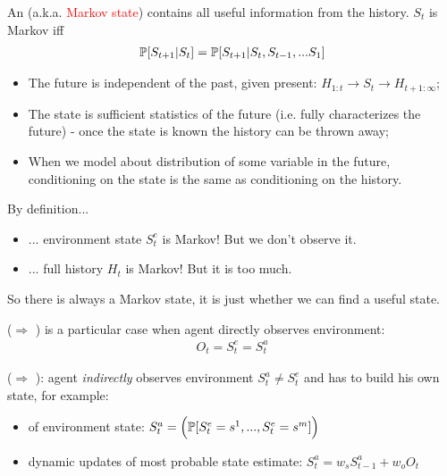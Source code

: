 An  (a.k.a. \textcolor{red}{Markov state}) contains all useful information from the history. $S_t$ is Markov iff
\begin{align*}
\mathbb{P} [S_{t+1}|S_t]	= \mathbb{P}[S_{t+1}| S_t, S_{t-1}, ... S_1]
\end{align*}
\begin{itemize}
	\item The future is independent of the past, given present: $H_{1:t} \to S_t \to H_{t+1:\infty}$;
	\item The state is sufficient statistics of the future (i.e. fully characterizes the future) - once the state is known the history can be thrown away;
	\item When we model about distribution of some variable in the future, conditioning on the state is the same as conditioning on the history.
\end{itemize}

\begin{notebox}
By definition...
	\begin{itemize}
		\item 	... environment state $S_t^e$ is Markov! But we don't observe it.
		\item   ... full history $H_t$ is Markov! But it is too much.
	\end{itemize}
So there is always a Markov state, it is just whether we can find a useful state.
\end{notebox}

 ($\Rightarrow$ ) is a particular case when agent directly observes environment:
\begin{align}
	O_t = S^e_t = S^a_t
\end{align}

 ($\Rightarrow$ ): agent \textit{indirectly} observes environment $S^a_t \neq S^e_t$ and has to build his own state, for example:
\begin{itemize}
	\item {} of environment state: $S^a_t = \Big(\mathbb{P}[S^e_t = s^1, ..., S^e_t = s^m]\Big)$
	\item dynamic updates of most probable state estimate: $S^a_t = w_s S^a_{t-1} + w_o O_t$
\end{itemize}


